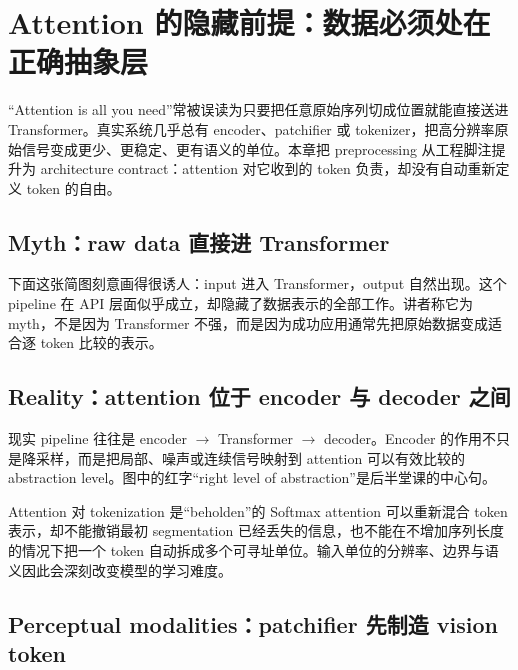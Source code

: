 \section{Attention 的隐藏前提：数据必须处在正确抽象层}

“Attention is all you need”常被误读为只要把任意原始序列切成位置就能直接送进 Transformer。真实系统几乎总有 encoder、patchifier 或 tokenizer，把高分辨率原始信号变成更少、更稳定、更有语义的单位。本章把 preprocessing 从工程脚注提升为 architecture contract：attention 对它收到的 token 负责，却没有自动重新定义 token 的自由。

\subsection{Myth：raw data 直接进 Transformer}

下面这张简图刻意画得很诱人：input 进入 Transformer，output 自然出现。这个 pipeline 在 API 层面似乎成立，却隐藏了数据表示的全部工作。讲者称它为 myth，不是因为 Transformer 不强，而是因为成功应用通常先把原始数据变成适合逐 token 比较的表示。


\subsection{Reality：attention 位于 encoder 与 decoder 之间}

现实 pipeline 往往是 encoder $\rightarrow$ Transformer $\rightarrow$ decoder。Encoder 的作用不只是降采样，而是把局部、噪声或连续信号映射到 attention 可以有效比较的 abstraction level。图中的红字“right level of abstraction”是后半堂课的中心句。


\begin{importantbox}{Attention 对 tokenization 是“beholden”的}
Softmax attention 可以重新混合 token 表示，却不能撤销最初 segmentation 已经丢失的信息，也不能在不增加序列长度的情况下把一个 token 自动拆成多个可寻址单位。输入单位的分辨率、边界与语义因此会深刻改变模型的学习难度。
\end{importantbox}

\subsection{Perceptual modalities：patchifier 先制造 vision token}

